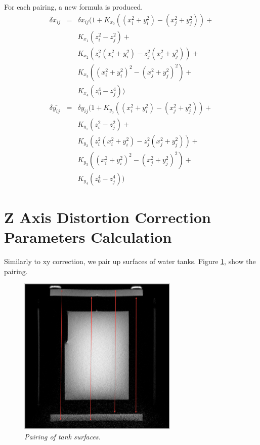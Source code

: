 For each pairing, a new formula is produced.
\begin{eqnarray} 
  \delta{\bar{x_{ij}}} & = & \delta{x_{ij}}(1 + K_{x_0}((x_i^2 + y_i^2) - (x_j^2 + y_j^2)) + \nonumber\\
  & & K_{x_1}(z_i^2 - z_j^2) + \nonumber\\
  & & K_{x_2}(z_i^2(x_i^2 + y_i^2)- z_j^2(x_j^2 + y_j^2)) + \nonumber\\
  & & K_{x_3}((x_i^2 + y_i^2)^2 - (x_j^2 + y_j^2)^2) + \nonumber\\
  & & K_{x_4}(z_0^4 - z_j^4)) \\
  \delta{\bar{y_{ij}}} & = & \delta{y_{ij}}(1 + K_{y_0}((x_i^2 + y_i^2) - (x_j^2 + y_j^2)) + \nonumber\\
  & & K_{y_1}(z_i^2 - z_j^2) + \nonumber\\
  & & K_{y_2}(z_i^2(x_i^2 + y_i^2)- z_j^2(x_j^2 + y_j^2)) + \nonumber\\
  & & K_{y_3}((x_i^2 + y_i^2)^2 - (x_j^2 + y_j^2)^2) + \nonumber\\
  & & K_{y_4}(z_0^4 - z_j^4))
\end{eqnarray}

\section{Z Axis Distortion Correction Parameters Calculation}

Similarly to xy correction, we pair up surfaces of water tanks. Figure \ref{fig:correction_surface_pairing}, 
show the pairing. \\

\begin{figure}[htb]
  \begin{center}
    \begin{minipage}[b]{3in}
      \centering
      \centerline{\mbox{\includegraphics[width=3in]{parameters/images/surface_pairing_z.eps}}}
    \end{minipage}
  \end{center}
  \caption{\emph{Pairing of tank surfaces. }}
  \label{fig:correction_surface_pairing}
\end{figure}

